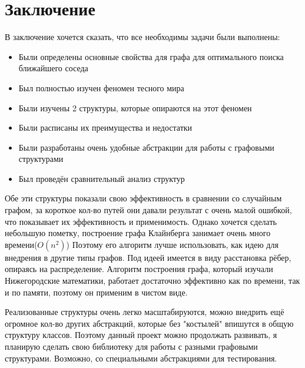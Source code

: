 \section{Заключение}

В заключение хочется сказать, что все необходимы задачи были выполнены:
\begin{itemize}
    \item Были определены основные свойства для графа для оптимального поиска ближайшего соседа
    \item Был полностью изучен феномен тесного мира
    \item Были изучены 2 структуры, которые опираются на этот феномен
    \item Были расписаны их преимущества и недостатки
    \item Были разработаны очень удобные абстракции для работы с графовыми структурами
    \item Был проведён сравнительный анализ структур
\end{itemize}

Обе эти структуры показали свою эффективность в сравнении со случайным графом, за короткое 
кол-во путей они давали результат с очень малой ошибкой, что показывает их эффективность
и применимость. Однако хочется сделать небольшую пометку, построение графа Клайнберга занимает очень
много времени($O(n^2)$) Поэтому его алгоритм лучше использовать, как идею для внедрения в другие типы графов. 
Под идеей имеется в виду расстановка рёбер, опираясь на распределение. Алгоритм построения графа,
который изучали Нижегородские математики, работает достаточно эффективно как по времени, так и по памяти,
поэтому он применим в чистом виде. 

Реализованные структуры очень легко масштабируются, можно внедрить ещё огромное кол-во других абстракций, которые
без "костылей" впишутся в общую структуру классов. Поэтому данный проект можно продолжать развивать,
я планирую сделать свою библиотеку для работы с разными графовыми структурами. Возможно, со
специальными абстракциями для тестирования.